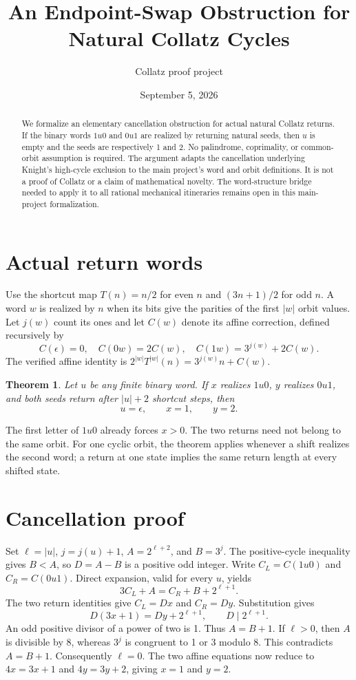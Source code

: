 \documentclass[10pt]{article}
\title{An Endpoint-Swap Obstruction for Natural Collatz Cycles}
\author{Collatz proof project}
\date{September 5, 2026}
\newtheorem{theorem}{Theorem}
\begin{document}
\maketitle
\begin{abstract}
We formalize an elementary cancellation obstruction for actual natural
Collatz returns. If the binary words $1u0$ and $0u1$ are realized by returning
natural seeds, then $u$ is empty and the seeds are respectively 1 and 2.
No palindrome, coprimality, or common-orbit assumption is required.
The argument adapts the cancellation underlying Knight's high-cycle
exclusion to the main project's word and orbit definitions. It is not a
proof of Collatz or a claim of mathematical novelty. The word-structure
bridge needed to apply it to all rational mechanical itineraries remains open
in this main-project formalization.
\end{abstract}

\section{Actual return words}
Use the shortcut map $T(n)=n/2$ for even $n$ and $(3n+1)/2$ for odd $n$.
A word $w$ is realized by $n$ when its bits give the parities of the first
$|w|$ orbit values. Let $j(w)$ count its ones and let $C(w)$ denote its
affine correction, defined recursively by
\[
 C(\epsilon)=0,\quad C(0w)=2C(w),\quad
 C(1w)=3^{j(w)}+2C(w).
\]
The verified affine identity is
$2^{|w|}T^{|w|}(n)=3^{j(w)}n+C(w)$.

\begin{theorem}
Let $u$ be any finite binary word. If $x$ realizes $1u0$, $y$ realizes
$0u1$, and both seeds return after $|u|+2$ shortcut steps, then
\[
 u=\epsilon,\qquad x=1,\qquad y=2.
\]
\end{theorem}
The first letter of $1u0$ already forces $x>0$. The two returns need not
belong to the same orbit. For one cyclic orbit, the theorem applies whenever
a shift realizes the second word; a return at one state implies the same
return length at every shifted state.

\section{Cancellation proof}
Set $\ell=|u|$, $j=j(u)+1$, $A=2^{\ell+2}$, and $B=3^j$.
The positive-cycle inequality gives $B<A$, so $D=A-B$ is a positive
odd integer. Write $C_L=C(1u0)$ and $C_R=C(0u1)$.
Direct expansion, valid for every $u$, yields
\[
3C_L+A=C_R+B+2^{\ell+1}.
\]
The two return identities give $C_L=Dx$ and $C_R=Dy$. Substitution gives
\[
D(3x+1)=Dy+2^{\ell+1},\qquad D\mid2^{\ell+1}.
\]
An odd positive divisor of a power of two is 1. Thus $A=B+1$.
If $\ell>0$, then $A$ is divisible by 8, whereas $3^j$ is congruent to
1 or 3 modulo 8. This contradicts $A=B+1$. Consequently $\ell=0$.
The two affine equations now reduce to $4x=3x+1$ and $4y=3y+2$,
giving $x=1$ and $y=2$.
\end{document}

